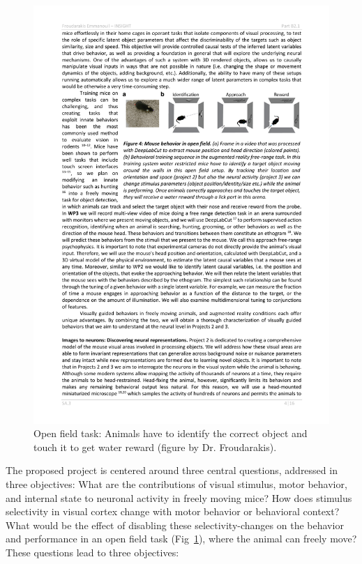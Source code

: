 \documentclass[B2,COG]{ercgrant}
\begin{document}
\begin{figure}
\vspace{-4ex}
\includegraphics[width=\linewidth,trim=0 15 0 5, clip]{figures/openfield_ar.pdf}
\caption{Open field task: Animals have to identify the correct object and touch it to get water reward (figure by Dr. Froudarakis).}
\label{fig:openfield}
\end{figure}
The proposed project is centered around three central questions, addressed in three objectives:
 What are the contributions of visual stimulus, motor behavior, and internal state to neuronal activity in freely moving mice?
 How does stimulus selectivity in visual cortex change with motor behavior or behavioral context?
 What would be the effect of disabling these selectivity-changes on the behavior and performance in an open field task (Fig~\ref{fig:openfield}), where the animal can freely move?
These questions lead to three objectives:
\end{document}

